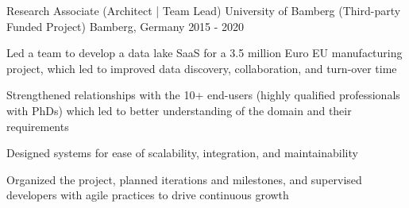 \clearpage 
{}


\begin{cventries}



  \cventry
    {Research Associate (Architect | Team Lead)} %
    {University of Bamberg (Third-party Funded Project)} %
    {Bamberg, Germany} %
    {2015 - 2020} %
    {
      \begin{cvitems} %
		\item {Led a team to develop a data lake SaaS for a 3.5 million Euro EU manufacturing project, which led to improved data discovery, collaboration, and turn-over time }
		\item {Strengthened relationships with the 10+ end-users (highly qualified professionals with PhDs) which led to better understanding of the domain and their requirements}
		\item {Designed systems for ease of scalability, integration, and maintainability}
		\item {Organized the project, planned iterations and milestones, and supervised developers with agile practices to drive continuous growth}
      \end{cvitems}
    }





\end{cventries}
